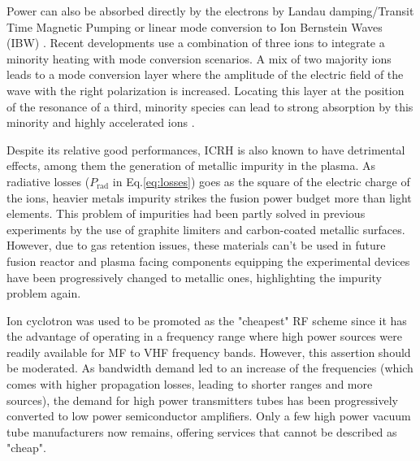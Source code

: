 Power can also be absorbed directly by the electrons by Landau damping/Transit Time Magnetic Pumping or linear mode conversion to Ion Bernstein Waves (IBW) . Recent developments use a combination of three ions to integrate a minority heating with mode conversion scenarios. A mix of two majority ions leads to a mode conversion layer where the amplitude of the electric field of the wave with the right polarization is increased. Locating this layer at the position of the resonance of a third, minority species can lead to strong absorption by this minority and highly accelerated ions .

Despite its relative good performances, ICRH is also known to have detrimental effects, among them the generation of metallic impurity in the plasma. As radiative losses ($P_{\mathrm{rad}}$ in Eq.\ref{eq:losses}) goes as the square of the electric charge of the ions, heavier metals impurity strikes the fusion power budget more than light elements. This problem of impurities had been partly solved in previous experiments by the use of graphite limiters and carbon-coated metallic surfaces. However, due to gas retention issues, these materials can't be used in future fusion reactor and plasma facing components equipping the experimental devices have been progressively changed to metallic ones, highlighting the impurity problem again.

Ion cyclotron was used to be promoted as the "cheapest" RF scheme since it has the advantage of operating in a frequency range where high power sources were readily available for MF to VHF frequency bands. However, this assertion should be moderated. As bandwidth demand led to an increase of the frequencies (which comes with higher propagation losses, leading to shorter ranges and more sources), the demand for high power transmitters tubes has been progressively converted to low power semiconductor amplifiers. Only a few high power vacuum tube manufacturers now remains, offering services that cannot be described as "cheap".


